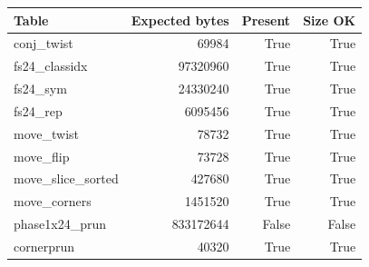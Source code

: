 {\small
\begin{tabular}{lrrr}
\hline
Table & Expected bytes & Present & Size OK \\
\hline
conj\_twist & 69984 & True & True \\
fs24\_classidx & 97320960 & True & True \\
fs24\_sym & 24330240 & True & True \\
fs24\_rep & 6095456 & True & True \\
move\_twist & 78732 & True & True \\
move\_flip & 73728 & True & True \\
move\_slice\_sorted & 427680 & True & True \\
move\_corners & 1451520 & True & True \\
phase1x24\_prun & 833172644 & False & False \\
cornerprun & 40320 & True & True \\
\hline
\end{tabular}
}
